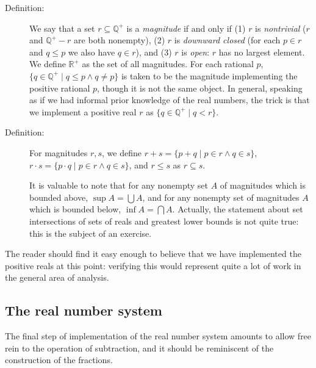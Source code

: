 \documentclass[12pt]{book}
\begin{document}
\begin{description}

\item[Definition:]  We say that a set $r \subseteq {\mathbb Q}^+$ is a {\em magnitude\/} if and only if (1) $r$ is {\em nontrivial} ($r$ and ${\mathbb Q}^+ -r$ are both nonempty), (2) $r$ is {\em downward closed} (for each $p \in r$ and $q \leq p$ we also have $q \in r$), and (3) $r$ is {\em open\/}:  $r$ has no largest element.   We define ${\mathbb R}^+$ as the set of all magnitudes.  For each rational $p$, $\{q \in {\mathbb Q}^+ \mid q \leq p \wedge q \neq p\}$ is taken to be the magnitude implementing the positive rational
$p$, though it is not the same object.  In general, speaking as if we had informal prior knowledge of the real numbers, the trick is that we implement a positive real $r$ as $\{q \in {\mathbb Q}^+ \mid q < r\}$.

\item[Definition:]  For magnitudes $r,s$, we define $r+s=\{p+q \mid p \in r \wedge q \in s\}$,   $r\cdot s=\{p\cdot q \mid p \in r \wedge q \in s\}$, and $r \leq s$ as $r \subseteq s$.

It is valuable to note that for any nonempty set $A$ of magnitudes which is bounded above, $\sup A = \bigcup A$, and for any nonempty set of magnitudes $A$ which is bounded below, $\inf A = \bigcap A$.  Actually, the statement about set intersections of sets of reals and greatest lower bounds  is not quite true:  this is the subject of an exercise.

\end{description}

The reader should find it easy enough to believe that we have implemented the positive reals at this point:  verifying this would represent quite a lot of work in the general area of analysis.

\subsection{The real number system}

The final step of implementation of the real number system amounts to allow free rein to the operation of subtraction, and it should be reminiscent of the construction of the fractions.
\end{document}
